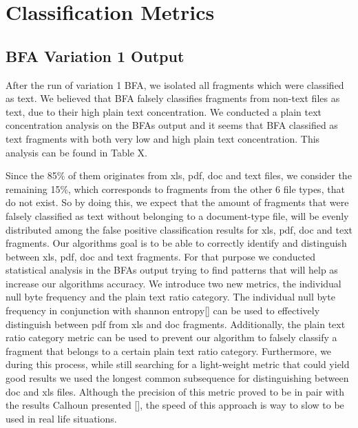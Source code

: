 \chapter{Classification  Metrics}
\section{BFA Variation 1 Output}
After the run of variation 1 BFA, we isolated all fragments which were classified as text. We believed that BFA falsely classifies fragments from non-text files as text, due to their high plain text concentration. We conducted a plain text concentration analysis on the BFAs output and it seems that BFA classified as text fragments with both very low and high plain text concentration. This analysis can be found in Table X.

 Since the 85\% of them originates from xls, pdf, doc and text files, we consider the remaining 15\%, which corresponds to fragments from the other 6 file types, that do not exist. So by doing this, we expect that the amount of fragments that were falsely classified as text without belonging to a document-type file, will be evenly distributed among the false positive classification results for xls, pdf, doc and text fragments. Our algorithms goal is to be able to correctly identify and distinguish between xls, pdf, doc and text fragments. For that purpose we conducted statistical analysis in the BFAs output trying to find patterns that will help as increase our algorithms accuracy. We introduce two new metrics, the individual null byte frequency and the plain text ratio category.  The individual null byte frequency in conjunction with shannon entropy[] can be used to effectively distinguish  between pdf from xls and doc fragments. Additionally, the plain text ratio category metric can be used to prevent our algorithm to falsely classify a fragment that belongs to a certain plain text ratio category. Furthermore, we during this process, while still searching for a light-weight metric that could yield good results we used the longest common subsequence for distinguishing between doc and xls files. Although the precision of this metric proved to be in pair with the results Calhoun presented [], the speed of this approach is way to slow to be used in real life situations.


